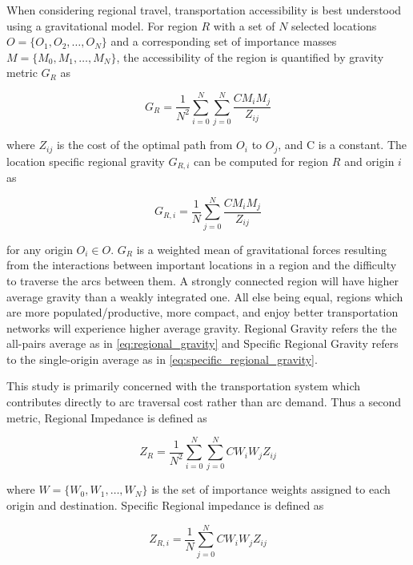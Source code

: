 \documentclass[11pt]{article}
\begin{document}
\begin{multicols}{2}
When considering regional travel, transportation accessibility is best understood using a gravitational model. For region $R$ with a set of $N$ selected locations $O = \{O_1, O_2, \dots, O_N\}$ and a corresponding set of importance masses $M = \{M_0, M_1, \dots, M_N\}$, the accessibility of the region is quantified by gravity metric $G_{R}$ as

\begin{equation}
	G_{R} = \frac{1}{N^2}\sum_{i = 0}^{N} \sum_{j = 0 }^{N} \frac{CM_iM_j}{Z_{ij}} \label{eq:regional_gravity}
\end{equation}

\noindent where $Z_{ij}$ is the cost of the optimal path from $O_i$ to $O_j$, and C is a constant. The location specific regional gravity $G_{R,i}$ can be computed for region $R$ and origin $i$ as

\begin{equation}
	G_{R,i} = \frac{1}{N}\sum_{j = 0 }^{N} \frac{CM_iM_j}{Z_{ij}} \label{eq:specific_regional_gravity}
\end{equation}

for any origin $O_i \in O$. $G_{R}$ is a weighted mean of gravitational forces resulting from the interactions between important locations in a region and the difficulty to traverse the arcs between them. A strongly connected region will have higher average gravity than a weakly integrated one. All else being equal, regions which are more populated/productive, more compact, and enjoy better transportation networks will experience higher average gravity. Regional Gravity refers the the all-pairs average as in \eqref{eq:regional_gravity} and Specific Regional Gravity refers to the single-origin average as in \eqref{eq:specific_regional_gravity}.

This study is primarily concerned with the transportation system which contributes directly to arc traversal cost rather than arc demand. Thus a second metric, Regional Impedance is defined as

\begin{equation}
	Z_{R} = \frac{1}{N^2}\sum_{i = 0}^{N} \sum_{j = 0 }^{N} CW_iW_jZ_{ij} \label{eq:regional_impedance}
\end{equation}

\noindent where $W = \{W_0, W_1, \dots, W_N\}$ is the set of importance weights assigned to each origin and destination. Specific Regional impedance is defined as

\begin{equation}
	Z_{R,i} = \frac{1}{N}\sum_{j = 0 }^{N} CW_iW_jZ_{ij} \label{eq:specific_regional_impedance}
\end{equation}


\end{multicols}
\end{document}
